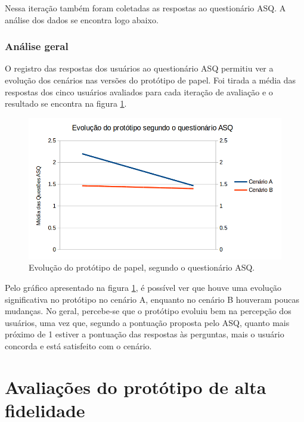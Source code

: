       Nessa iteração também foram coletadas as respostas ao questionário ASQ. A análise dos dados se encontra logo abaixo.
    
    \subsubsection{Análise geral}
    
      O registro das respostas dos usuários ao questionário ASQ permitiu ver a evolução dos cenários nas versões do 
      protótipo de papel. Foi tirada a média das respostas dos cinco usuários avaliados para cada iteração de avaliação
      e o resultado se encontra na figura \ref{evolucao_prototipo_papel_ASQ}.
      
      \begin{figure}[!htpb]
	\centering
	\includegraphics[scale=0.35]{editaveis/figuras/evolucao_prototipo_papel_ASQ}
	\caption[Evolução do protótipo de papel, segundo o questionário ASQ]
	  {Evolução do protótipo de papel, segundo o questionário ASQ.}
	\label{evolucao_prototipo_papel_ASQ}
      \end{figure}
      
      Pelo gráfico apresentado na figura \ref{evolucao_prototipo_papel_ASQ}, é possível ver que houve uma evolução significativa
      no protótipo no cenário A, enquanto no cenário B houveram poucas mudanças. No geral, percebe-se que o protótipo evoluiu
      bem na percepção dos usuários, uma vez que, segundo a pontuação proposta pelo ASQ, quanto mais próximo de 1 estiver
      a pontuação das respostas às perguntas, mais o usuário concorda e está satisfeito com o cenário.
      
  \section{Avaliações do protótipo de alta fidelidade}
    
